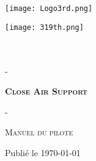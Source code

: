 \thispagestyle{empty}

\begin{center}
    \null
    
    \vfill
    
    \texttt{[image: Logo3rd.png]}
    
    \vfill
    
    \begin{minipage}{\textwidth}
        \centering
        \texttt{[image: 319th.png]}\\[1ex]
        {\Large \rgt{}}\\[1ex]
        {\Large \inmem{}}\\[2ex]
    \end{minipage}
    
    \vfil
    
    {\Large - }%
    
    \vfil
    
    {\fontsize{40}{60}\selectfont \textbf{\textsc{Close Air Support}}}%
    
    \vfil
    
    {\Large - }%
    
    \vfil
    
    {\Large \textsc{Manuel du pilote}}%
    
    \vfil
    
    \vskip2cm %
    
    \vfill
    
    {\large \version }%
    
    \vfil
    
    {\large Publié le \today}%
    
    \vfill
\end{center}